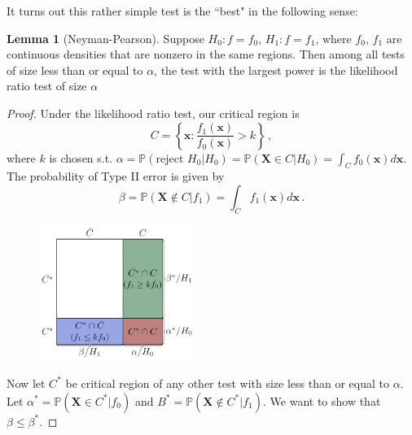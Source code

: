 \documentclass[a4paper,11pt]{article}
\theoremstyle{definition}
\newtheorem*{lem}{Lemma}
\numberwithin{equation}{section}
\begin{document}
It turns out this rather simple test is the ``best" in the following sense:

\begin{lem}[Neyman-Pearson]
Suppose $H_0:f=f_0$, $H_1:f=f_1$, where $f_0$, $f_1$ are continuous densities that are nonzero in the same regions. Then among all tests of size less than or equal to $\alpha$, the test with the largest power is the likelihood ratio test of size $\alpha$
\end{lem}

\begin{proof}
Under the likelihood ratio test, our critical region is
\[
C=\left\{\mathbf{x}:\frac{f_1(\mathbf{x})}{f_0(\mathbf{x})}>k\right\}\,,
\]
where $k$ is chosen s.t. $\alpha=\mathbb{P}(\text{reject }H_0|H_0)=\mathbb{P}(\mathbf{X}\in C|H_0)=\int_Cf_0(\mathbf{x})d\mathbf{x}$. The probability of Type II error is given by
\[
\beta=\mathbb{P}(\mathbf{X}\not\in C|f_1)=\int_{\bar{C}}f_1(\mathbf{x})d\mathbf{x}\,.
\]

\begin{figure}[t]
    \centering
    \includegraphics[width=0.45\textwidth]{critregions.PNG}
\end{figure}

Now let $C^*$ be critical region of any other test with size less than or equal to $\alpha$. Let $\alpha^*=\mathbb{P}(\mathbf{X}\in C^*|f_0)$ and $B^*=\mathbb{P}(\mathbf{X}\not\in C^*|f_1)$. We want to show that $\beta\leq\beta^*$.


\end{proof}
\end{document}
